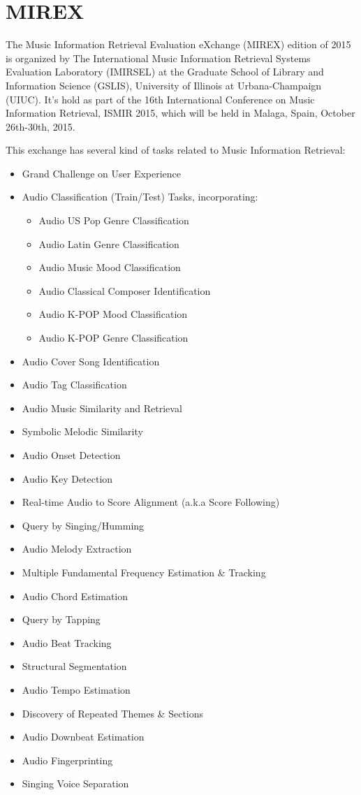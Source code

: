 \documentclass[a4paper,openany,oneside,12pt]{book}
\begin{document}
\section{MIREX}
The Music Information Retrieval Evaluation eXchange (MIREX) edition of 2015 is organized by The International Music Information Retrieval Systems Evaluation Laboratory (IMIRSEL) at the Graduate School of Library and Information Science (GSLIS), University of Illinois at Urbana-Champaign (UIUC). It's hold as part of the 16th International Conference on Music Information Retrieval, ISMIR 2015, which will be held in Malaga, Spain, October 26th-30th, 2015.

This exchange has several kind of tasks related to Music Information Retrieval:

\begin{itemize}
    \item Grand Challenge on User Experience
    \item Audio Classification (Train/Test) Tasks, incorporating:
    \begin{itemize}
        \item Audio US Pop Genre Classification
        \item Audio Latin Genre Classification
        \item Audio Music Mood Classification
        \item Audio Classical Composer Identification
        \item Audio K-POP Mood Classification
        \item Audio K-POP Genre Classification 
    \end{itemize}
    \item Audio Cover Song Identification
    \item Audio Tag Classification
    \item Audio Music Similarity and Retrieval
    \item Symbolic Melodic Similarity
    \item Audio Onset Detection
    \item Audio Key Detection
    \item Real-time Audio to Score Alignment (a.k.a Score Following)
    \item Query by Singing/Humming
    \item Audio Melody Extraction
    \item Multiple Fundamental Frequency Estimation \& Tracking
    \item Audio Chord Estimation
    \item Query by Tapping
    \item Audio Beat Tracking
    \item Structural Segmentation
    \item Audio Tempo Estimation
    \item Discovery of Repeated Themes \& Sections
    \item Audio Downbeat Estimation
    \item Audio Fingerprinting
    \item Singing Voice Separation 
\end{itemize}
\end{document}
